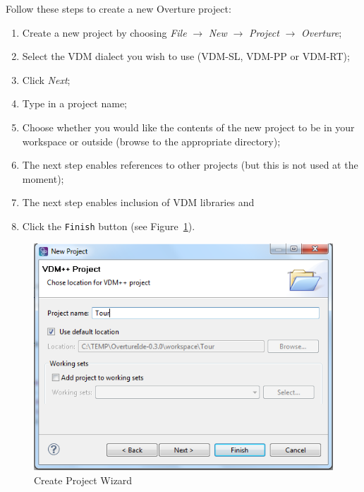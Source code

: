 \documentclass{overturerepchap}
\begin{document}
Follow these steps to create a new Overture project:

\begin{enumerate}
	\item Create a new project by choosing \emph{File}
          $\rightarrow$ \emph{New} $\rightarrow$ \emph{Project}
          $\rightarrow$ \emph{Overture}; 
	\item Select the VDM dialect you wish to use (VDM-SL, VDM-PP
          or VDM-RT);
	\item Click \emph{Next};
         \item Type in a project name;
	\item Choose whether you would like the contents of the new
          project to be in your workspace or outside
          (browse to the appropriate directory); 
\item The next step enables references to other projects (but this is not used at the moment);
\item The next step enables inclusion of VDM libraries and
    \item Click	the \texttt{Finish} button (see Figure~\ref{fig:CreateProjectWizard}).
\end{enumerate}

\begin{figure}[!htb]
	\begin{center}
	  \includegraphics[scale=0.8]{figures/CreateProjectWizard}
	  \caption[Create Project Wizard]{Create Project Wizard}
	  \label{fig:CreateProjectWizard}
	\end{center}
\end{figure}
\end{document}
